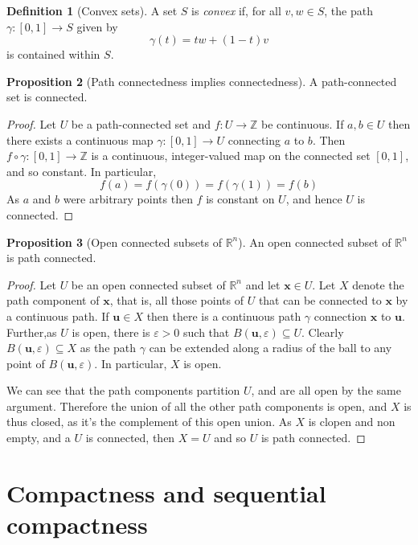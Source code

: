 \documentclass[10pt,fleqn]{article}
\newcommand{\reals}{\mathbb{R}}
\newcommand{\eps}{\varepsilon}
\newcommand{\vc}[1]{\boldsymbol{#1}}
\theoremstyle{definition} \newtheorem{defn}{Definition}[section]
\theoremstyle{plain}      \newtheorem{thm}[defn]{Theorem}
\theoremstyle{definition} \newtheorem{prop}[defn]{Proposition}
\theoremstyle{definition} \newtheorem{cor}[defn]{Corollary}
\theoremstyle{definition} \newtheorem{ex}[defn]{Example}
\theoremstyle{definition} \newtheorem{rem}[defn]{Remark}
\begin{document}
\begin{defn}[Convex sets]
    A set $S$ is \emph{convex} if, for all $v,w\in S$, the path $\gamma:[0,1]\to S$ given by
    \[
        \gamma(t)=tw+(1-t)v
    \]
    is contained within $S$.
\end{defn}

\begin{prop}[Path connectedness implies connectedness]
    A path-connected set is connected.
\end{prop}

\begin{proof}
    Let $U$ be a path-connected set and $f:U\to\mathbb{Z}$ be continuous.
    If $a,b\in U$ then there exists a continuous map $\gamma:[0,1]\to U$ connecting $a$ to $b$.
    Then $f\circ\gamma:[0,1]\to\mathbb{Z}$ is a continuous, integer-valued map on the connected set $[0,1]$, and so constant.
    In particular,
    \[
        f(a)=
        f(\gamma(0))=
        f(\gamma(1))=
        f(b)
    \]
    As $a$ and $b$ were arbitrary points then $f$ is constant on $U$, and hence $U$ is connected.
\end{proof}

\begin{prop}[Open connected subsets of $\reals^n$]
    An open connected subset of $\reals^n$ is path connected.
\end{prop}

\begin{proof}
    Let $U$ be an open connected subset of $\reals^n$ and let $\vc{x}\in U$.
    Let $X$ denote the path component of $\vc{x}$, that is, all those points of $U$ that can be connected to $\vc{x}$ by a continuous path.
    If $\vc{u}\in X$ then there is a continuous path $\gamma$ connection $\vc{x}$ to $\vc{u}$.
    Further,as $U$ is open, there is $\eps>0$ such that $B(\vc{u},\eps)\subseteq U$.
    Clearly $B(\vc{u},\eps)\subseteq X$ as the path $\gamma$ can be extended along a radius of the ball to any point of $B(\vc{u},\eps)$.
    In particular, $X$ is open.

    We can see that the path components partition $U$, and are all open by the same argument.
    Therefore the union of all the other path components is open, and $X$ is thus closed, as it's the complement of this open union.
    As $X$ is clopen and non empty, and a $U$ is connected, then $X=U$ and so $U$ is path connected.
\end{proof}


\section{Compactness and sequential compactness}
\end{document}
